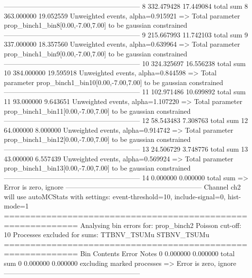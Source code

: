 ------------------------------------------------------------
8          332.479428      17.449084       total sum                     
8          363.000000      19.052559       Unweighted events, alpha=0.915921
  => Total parameter prop_binch1_bin8[0.00,-7.00,7.00] to be gaussian constrained
------------------------------------------------------------
9          215.667993      11.742103       total sum                     
9          337.000000      18.357560       Unweighted events, alpha=0.639964
  => Total parameter prop_binch1_bin9[0.00,-7.00,7.00] to be gaussian constrained
------------------------------------------------------------
10         324.325697      16.556238       total sum                     
10         384.000000      19.595918       Unweighted events, alpha=0.844598
  => Total parameter prop_binch1_bin10[0.00,-7.00,7.00] to be gaussian constrained
------------------------------------------------------------
11         102.971486      10.699892       total sum                     
11         93.000000       9.643651        Unweighted events, alpha=1.107220
  => Total parameter prop_binch1_bin11[0.00,-7.00,7.00] to be gaussian constrained
------------------------------------------------------------
12         58.543483       7.308763        total sum                     
12         64.000000       8.000000        Unweighted events, alpha=0.914742
  => Total parameter prop_binch1_bin12[0.00,-7.00,7.00] to be gaussian constrained
------------------------------------------------------------
13         24.506729       3.748776        total sum                     
13         43.000000       6.557439        Unweighted events, alpha=0.569924
  => Total parameter prop_binch1_bin13[0.00,-7.00,7.00] to be gaussian constrained
------------------------------------------------------------
14         0.000000        0.000000        total sum                     
  => Error is zero, ignore      
------------------------------------------------------------
Channel ch2 will use autoMCStats with settings: event-threshold=10, include-signal=0, hist-mode=1
============================================================
Analysing bin errors for: prop_binch2
Poisson cut-off: 10
Processes excluded for sums: TTBNV_TSUMu STBNV_TSUMu
============================================================
Bin        Contents        Error           Notes                         
0          0.000000        0.000000        total sum                     
0          0.000000        0.000000        excluding marked processes    
  => Error is zero, ignore      
------------------------------------------------------------
